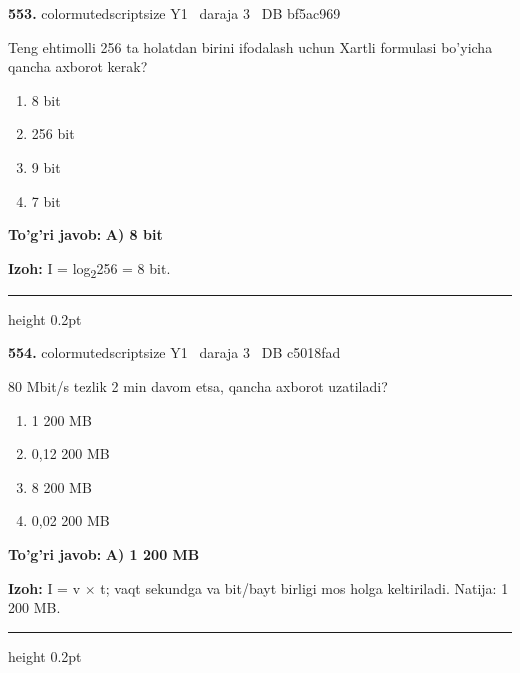 \documentclass[10pt,a4paper,oneside]{article}
\begin{document}
\noindent\textbf{\color{ink}553.}  {color{muted}scriptsize Y1 \textbullet\ daraja 3 \textbullet\ DB bf5ac969}
\par
Teng ehtimolli 256 ta holatdan birini ifodalash uchun Xartli formulasi bo'yicha qancha axborot kerak?
\begin{enumerate}[label=\Alph*),leftmargin=9mm]
\item 8 bit
\item 256 bit
\item 9 bit
\item 7 bit
\end{enumerate}
\begin{tcolorbox}[enhanced,breakable,colback=teal!4,colframe=teal!50!black,boxrule=0.5pt,arc=1.1mm,left=3mm,right=3mm,top=1.7mm,bottom=1.7mm,before skip=2mm,after skip=2mm]
\textbf{\color{teal}To'g'ri javob:} \textbf{A) 8 bit}
\par\smallskip
\textbf{Izoh:} I = log\textsubscript{2}256 = 8 bit.
\end{tcolorbox}
\vspace{2mm}\hrule height 0.2pt \vspace{3mm}

\noindent\textbf{\color{ink}554.}  {color{muted}scriptsize Y1 \textbullet\ daraja 3 \textbullet\ DB c5018fad}
\par
80 Mbit/s tezlik 2 min davom etsa, qancha axborot uzatiladi?
\begin{enumerate}[label=\Alph*),leftmargin=9mm]
\item 1 200 MB
\item 0,12 200 MB
\item 8 200 MB
\item 0,02 200 MB
\end{enumerate}
\begin{tcolorbox}[enhanced,breakable,colback=teal!4,colframe=teal!50!black,boxrule=0.5pt,arc=1.1mm,left=3mm,right=3mm,top=1.7mm,bottom=1.7mm,before skip=2mm,after skip=2mm]
\textbf{\color{teal}To'g'ri javob:} \textbf{A) 1 200 MB}
\par\smallskip
\textbf{Izoh:} I = v \ensuremath{\times} t; vaqt sekundga va bit/bayt birligi mos holga keltiriladi. Natija: 1 200 MB.
\end{tcolorbox}
\vspace{2mm}\hrule height 0.2pt \vspace{3mm}
\end{document}
